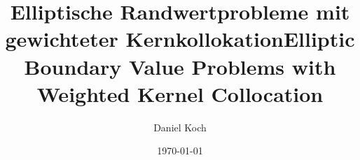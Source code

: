\documentclass[%
  bachelor,%
  draft,%
  english,%
  ngerman,%
  male,%
]{iswstud}
\author{Daniel Koch}
\date{\today}
\title{Elliptische Randwertprobleme mit gewichteter Kernkollokation}
\theoremstyle{plain}
\theoremstyle{definition}
\theoremstyle{definition}
\theoremstyle{remark}
\begin{document}
\frontmatter

\maketitle



\begin{otherlanguage}{english}
  \title{Elliptic Boundary Value Problems with Weighted Kernel Collocation}
  \shorttitle{}
  \subtitle{}

  \maketitle
\end{otherlanguage}



\begin{abstract}
  
\end{abstract}



\begin{otherlanguage}{english}
  \begin{abstract}

       
  \end{abstract}
\end{otherlanguage}
\end{document}
